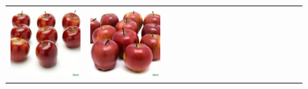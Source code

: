 \begin{figure}
\begin{adjustwidth}{-0.8in}{-0.5in}
\begin{tabular}{cccccccccccccccccccc}
\multicolumn{3}{c}{\includegraphics[width=\twobytwocolwidth\textwidth]{figures/limitations/apples_count8.jpg}} &
\multicolumn{3}{c}{\includegraphics[width=\twobytwocolwidth\textwidth]{figures/limitations/apples_count11.jpg}} &&

\end{tabular}
\end{adjustwidth}
\end{figure}
